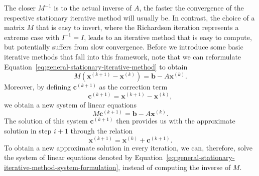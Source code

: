 The closer $M^{-1}$ is to the actual inverse of $A$, the faster the convergence of the respective stationary iterative method will usually be.
In contrast, the choice of a matrix $M$ that is easy to invert, where the Richardson iteration represents a extreme case with $I^{-1} = I$, leads to an iterative method that is easy to compute, but potentially suffers from slow convergence.
Before we introduce some basic iterative methods that fall into this framework, note that we can reformulate Equation~\eqref{eq:general-stationary-iterative-method} to obtain
\begin{equation}
	M (\bm{x}^{(k+1)} - \bm{x}^{(k)}) = \bm{b} - A \bm{x}^{(k)}. 
\end{equation}
Moreover, by defining $\bm{c}^{(k+1)}$ as the correction term
\begin{equation}
	\bm{c}^{(k+1)} = \bm{x}^{(k+1)} - \bm{x}^{(k)},
\end{equation}
we obtain a new system of linear equations
\begin{equation}
	M \bm{c}^{(k+1)} = \bm{b} - A \bm{x}^{(k)}. 
	\label{eq:general-stationary-iterative-method-system-formulation}
\end{equation}
The solution of this system $\bm{c}^{(k+1)}$ then provides us with the approximate solution in step $i+1$ through the relation
\begin{equation}
	\bm{x}^{(k+1)} =  \bm{x}^{(k)} + \bm{c}^{(k+1)}.
\end{equation}
To obtain a new approximate solution in every iteration, we can, therefore, solve the system of linear equations denoted by Equation~\eqref{eq:general-stationary-iterative-method-system-formulation}, instead of computing the inverse of $M$.

